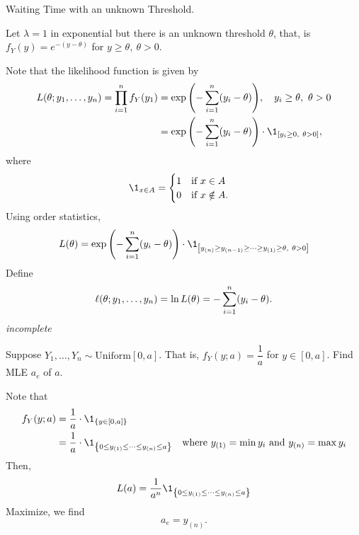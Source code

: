 \begin{eg}
	Waiting Time with an unknown Threshold.\par 
	Let $\lambda=1$ in exponential but there is an unknown threshold $\theta$, that, is $f_Y(y)=e^{-(y-\theta)}$ for $y\geq\theta,\ \theta>0$.	
	\begin{sol}
		Note that the likelihood function is given by \begin{align*}L(\theta;y_1,\dots,y_n)=\prod_{i=1}^nf_Y(y_1)&=\exp\qty(-\sum_{i=1}^n(y_i-\theta)),\quad y_i\geq\theta,\ \theta>0\\&=\exp\qty(-\sum_{i=1}^n(y_i-\theta))\cdot\1_{\qty[y_i\geq0,\ \theta>0]},\end{align*} where \[\1_{x\in A}=\begin{cases}1\quad\text{if }x\in A\\0\quad\text{if }x\notin A.\end{cases}\] Using order statistics, \[L(\theta)=\exp\qty(-\sum_{i=1}^n(y_i-\theta))\cdot\1_{\qty[y_{(n)}\geq y_{(n-1)}\geq\cdots\geq y_{(1)}\geq\theta,\ \theta>0]}\] Define \[\ell(\theta;y_1,\dots,y_n)=\ln L(\theta)=-\sum_{i=1}^n(y_i-\theta).\]
		\textit{incomplete}
	\end{sol}
\end{eg}
\begin{eg}
	Suppose $Y_1,\dots,Y_n\sim\text{Uniform}[0,a]$. That is, $f_Y(y;a)=\dfrac{1}{a}$ for $y\in[0,a]$. Find MLE $a_e$ of $a$. 
	\begin{sol}
		Note that \begin{align*}f_Y(y;a)&=\dfrac{1}{a}\cdot\1_{\qty{y\in[0,a]}}\\&=\dfrac{1}{a}\cdot\1_{\qty{0\leq y_{(1)}\leq\cdots\leq y_{(n)}\leq a}}&\text{where } y_{(1)}=\min y_i\text{ and } y_{(n)}=\max y_i\end{align*} Then, \[L(a)=\dfrac{1}{a^n}\1_{\qty{0\leq y_{(1)}\leq\cdots\leq y_{(n)}\leq a}}\] Maximize, we find \[a_e=y_{(n)}.\]
	\end{sol}
\end{eg}


